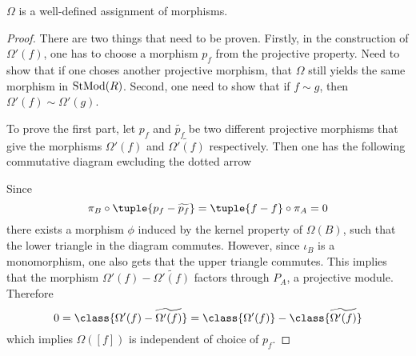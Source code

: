 \begin{lemma}
    \label{lem:stmod_omega_f_is_well_defined}
    \( \Omega \) is a well-defined assignment of morphisms.
\end{lemma}
\begin{proof}
    There are two things that need to be proven. Firstly, in the construction of \( \Omega'(f) \), one has to choose a morphism \( p_f \) from the projective property. Need to show that if one choses another projective morphism, that \( \Omega \) still yields the same morphism in \( \operatorname{StMod}(R) \). Second, one need to show that if \( f \sim g \), then \( \Omega'(f) \sim \Omega'(g) \).

    To prove the first part, let \( p_f \) and \( \widetilde{p_f} \) be two different projective morphisms that give the morphisms \( \Omega'(f) \) and \( \widetilde{\Omega'(f)} \) respectively. Then one has the following commutative diagram ewcluding the dotted arrow
    \begin{center}
    \end{center}

    Since
    \[
        \pi_B \circ \tuple{p_f - \widetilde{p_f}} = \tuple{f - f} \circ \pi_A = 0
    \]
    there exists a morphism \( \phi \) induced by the kernel property of \( \Omega(B) \), such that the lower triangle in the diagram commutes. However, since \( \iota_B \) is a monomorphism, one also gets that the upper triangle commutes. This implies that the morphism \( \Omega'(f) - \widetilde{\Omega'(f)} \) factors through \( P_A \), a projective module. Therefore
    \[
        0 = \class{\Omega'(f) - \widetilde{\Omega'(f)}} = \class{\Omega'(f)} - \class{\widetilde{\Omega'(f)}}
    \]
    which implies \( \Omega([f]) \) is independent of choice of \( p_f \).


\end{proof}
